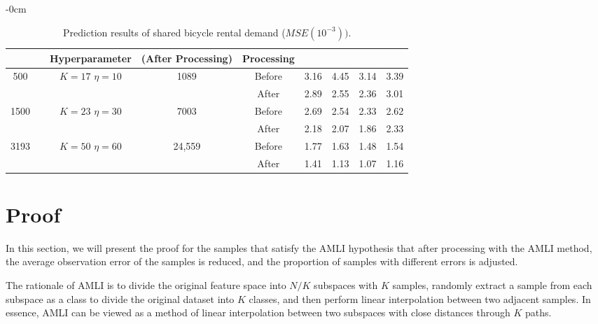 \documentclass[mathematics,article,accept,pdftex,moreauthors]{Definitions/mdpi}
\begin{document}
\begin{table}[H]
	\caption{Prediction results of shared bicycle rental demand ($MSE(10^{-3}))$.}
	\label{tab6}
	
	\begin{adjustwidth}{-\extralength}{0cm}\centering


	
	{\renewcommand{\tabcolsep}{3.45mm}
		\small\begin{tabular}{ccccccccc}
			\toprule
			\boldmath{$N$}  & & \textbf{Hyperparameter} &  \textbf{\boldmath{$N$} (After Processing)} & \textbf{\boldmath{AMLI} Processing} & \boldmath{$KNN$} & \boldmath{$FNN$} & \boldmath{$GBDT$} & \boldmath{$RF$}    \\\midrule
			\multirow{2}{1cm}{500} & & \multirow{2}{1.3cm}{$K=17$ $\eta=10$} & \multirow{2}{1cm}{1089} & Before & 3.16 & 4.45 & 3.14 & 3.39\\
			& & & &  After & 2.89 & 2.55 & 2.36 & 3.01 \\
			\multirow{2}{1cm}{1500} & & \multirow{2}{1.3cm}{$K=23$ $\eta=30$} & \multirow{2}{1cm}{7003} & Before & 2.69 & 2.54 & 2.33 & 2.62\\
			& & & &  After & 2.18 & 2.07 & 1.86 & 2.33 \\
			\multirow{2}{1cm}{3193} & & \multirow{2}{1.3cm}{$K=50$ $\eta=60$} & \multirow{2}{1cm}{24,559} & Before & 1.77 & 1.63 & 1.48 & 1.54\\
			& & & &  After & 1.41 & 1.13 & 1.07 & 1.16 \\
			\bottomrule
	\end{tabular}}
	\end{adjustwidth}
\end{table}

\section{ Proof}

 In this section, we will present the proof for the samples that satisfy the AMLI hypothesis that after processing with the AMLI method, the average observation error of the samples is reduced, and the proportion of samples with different errors is adjusted.

The rationale of AMLI is to divide the original feature space into $N/K$ subspaces with $K$ samples, randomly extract a sample from each subspace as a class to divide the original dataset into $K$ classes, and then perform linear interpolation between two adjacent samples. In essence, AMLI can be viewed as a method of linear interpolation between two subspaces with close distances through $K$ paths.
\end{document}
